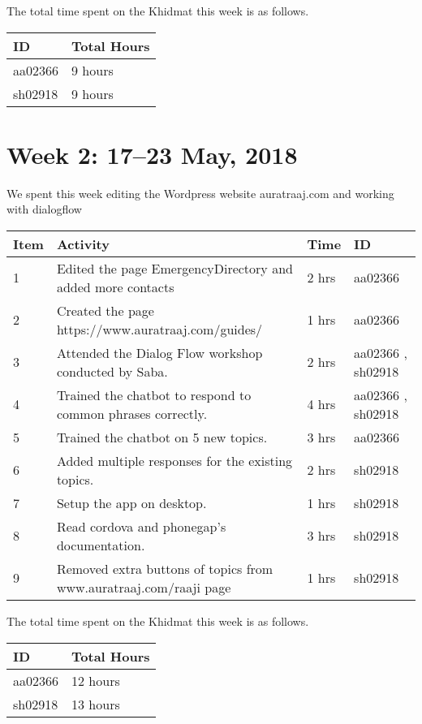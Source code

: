 \documentclass{article}
\begin{document}
The total time spent on the Khidmat this week is as follows.

\begin{tabular}{|l|l|}
  \hline
  ID & Total Hours\\\hline\hline
  aa02366 & 9 hours\\\hline
  sh02918 & 9 hours\\\hline
\end{tabular}

\newpage %
\section*{Week 2: 17--23 May, 2018}

We spent this week editing the Wordpress website auratraaj.com and working with dialogflow

\begin{tabular}{|l|l|l|l|}
  \hline
  Item 	& Activity & Time & ID \\\hline\hline
  1	& Edited the page EmergencyDirectory and added more contacts & 2 hrs & aa02366 \\\hline
  2	& Created the page https://www.auratraaj.com/guides/ & 1 hrs & aa02366 \\\hline
  3	& Attended the Dialog Flow workshop conducted by Saba. & 2 hrs & aa02366 , sh02918 \\\hline
  4	& Trained the chatbot to respond to common phrases correctly. & 4 hrs & aa02366 , sh02918 
  \\\hline
  5	& Trained the chatbot on 5 new topics. & 3 hrs & aa02366 \\\hline
  6	& Added multiple responses for the existing topics. & 2 hrs & sh02918 
  \\\hline
  7	& Setup the app on desktop. & 1 hrs & sh02918 
  \\\hline  
  8	& Read cordova and phonegap’s documentation. & 3 hrs & sh02918 
  \\\hline 
  9	& Removed extra buttons of topics from www.auratraaj.com/raaji page & 1 hrs & sh02918 
  \\\hline  
\end{tabular}

The total time spent on the Khidmat this week is as follows.

\begin{tabular}{|l|l|}
  \hline
  ID & Total Hours\\\hline\hline
  aa02366 & 12 hours\\\hline
  sh02918 & 13 hours\\\hline
\end{tabular}
\end{document}
